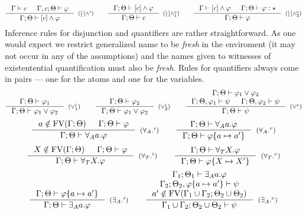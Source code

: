 \documentclass[english, mgr]{iithesis}
\begin{document}
$$
  \inference{
    \cjgmnt[\cEnv]{\constr} &
    \jgmnt[\cEnv, \constr;\Theta]{\formphi}
  }{
    \jgmnt[\cEnv;\Theta]{\fCAnd{\constr}\formphi}
  }[(\ensuremath{\fCAnd{\cdot}^i})]
  \qquad
  \inference{
    \jgmnt[\cEnv;\Theta]{\fCAnd{\constr}\formphi}
    }{
    \jgmnt[\cEnv;\Theta]{\constr}
  }[(\ensuremath{\fCAnd{\cdot}^e_1})]\qquad
  \inference{
    \jgmnt[\cEnv]{\fCAnd{\constr}\formphi} &
    \jgmnt[\cEnv;\Theta]{\formphi: \kProp}
    }{
    \jgmnt[\cEnv;\Theta]{\formphi}
  }[(\ensuremath{\fCAnd{\cdot}^e_2})]
$$
Inference rules for disjunction and quantifiers are rather straightforward.
As one would expect we restrict generalized name to be \textit{fresh} in the enviroment (it may not occur in any of the assumptions)
and the names given to witnesses of existentential quantification must also be \textit{fresh}.
Rules for quantifiers always come in pairs --- one for the atoms and one for the variables.
$$
  \inference{
    \jgmnt[\cEnv;\Theta]{\formphi_1}
    }{
    \jgmnt[\cEnv;\Theta]{\formphi_1 \vee \formphi_2}
  }[(\ensuremath{\vee^i_1})]
  \qquad
  \inference{
    \jgmnt[\cEnv;\Theta]{\formphi_2}
  }{
    \jgmnt[\cEnv;\Theta]{\formphi_1 \vee \formphi_2}
  }[(\ensuremath{\vee^i_2})]
  \qquad
  \inference{
    \jgmnt[\cEnv;\Theta]{\formphi_1 \vee \formphi_2} \\
    \jgmnt[\cEnv;\Theta,\formphi_1]{\psi} &
    \jgmnt[\cEnv;\Theta,\formphi_2]{\psi}
  }{
    \jgmnt[\cEnv;\Theta]{\psi}
  }[(\ensuremath{\vee^e})]
$$
$$
  \inference{
    \atomv \notin \fv[\cEnv;\Theta] &
    \jgmnt[\cEnv;\Theta]{\formphi}
  }{
    \jgmnt[\cEnv;\Theta]{\fForallAtom{\atomv}\formphi}
  }[(\ensuremath{{\fForallAtom{}}^i})]
  \qquad
  \inference{
    \jgmnt[\cEnv;\Theta]{\fForallAtom{\atomv}\formphi}
  }{
    \jgmnt[\cEnv;\Theta]{\formphi \{\atomv \mapsto \atomv'\}}
  }[(\ensuremath{{\fForallAtom{}}^e})]
$$
$$
  \inference{
    \termv \notin \fv[\cEnv;\Theta] &
    \jgmnt[\cEnv;\Theta]{\formphi}
  }{
    \jgmnt[\cEnv;\Theta]{\fForallTerm{\termv}\formphi}
  }[(\ensuremath{{\fForallTerm{}}^i})]
  \qquad
  \inference{
    \jgmnt[\cEnv;\Theta]{\fForallTerm{\termv}\formphi}
  }{
    \jgmnt[\cEnv;\Theta]{\formphi \{\termv \mapsto \termv'\}}
  }[(\ensuremath{{\fForallTerm{}}^e})]
$$
$$
  \inference{
    \jgmnt[\cEnv;\Theta]{\formphi \{\atomv \mapsto \atomv'\}}
    }{
    \jgmnt[\cEnv;\Theta]{\fExistsAtom{\atomv}\formphi}
  }[(\ensuremath{{\fExistsAtom{}}^i})]
  \qquad
  \inference{
    \jgmnt[\cEnv_1;\Theta_1]{\fExistsAtom{\atomv}\formphi} \\
    \jgmnt[\cEnv_2;\Theta_2,\formphi \{\atomv \mapsto \atomv'\}]{\psi} \\
    \atomv' \notin \fv[\cEnv_1 \cup \cEnv_2;\Theta_2 \cup \Theta_2]
    }{
    \jgmnt[\cEnv_1 \cup \cEnv_2;\Theta_2 \cup \Theta_2]{\psi}
  }[(\ensuremath{{\fExistsAtom{}}^e})]
$$
\end{document}
